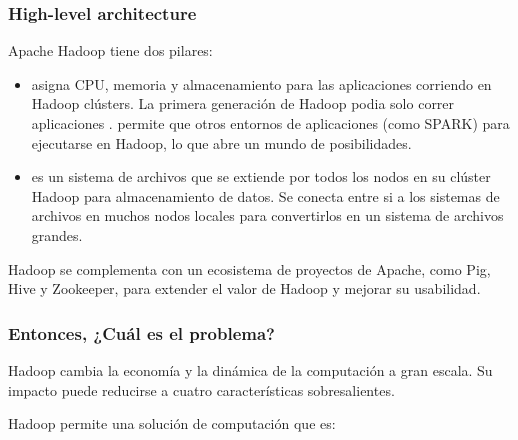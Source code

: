 \subsubsection*{High-level architecture} 
Apache Hadoop tiene dos pilares:

\begin{itemize}
	\item {} asigna CPU, memoria y almacenamiento para las aplicaciones corriendo en Hadoop clústers. La primera generación de Hadoop podia solo correr aplicaciones .  permite que otros entornos de aplicaciones (como SPARK) para ejecutarse en Hadoop, lo que abre un mundo de posibilidades.
	
	\item {} es un sistema de archivos que se extiende por todos los nodos en su clúster Hadoop para almacenamiento de datos. Se conecta entre si a los sistemas de archivos en muchos nodos locales para convertirlos en un sistema de archivos grandes.
\end{itemize}

Hadoop se complementa con un ecosistema de proyectos de Apache, como Pig\cite{online_ibm_meaning_pig}, Hive\cite{online_ibm_meaning_hive} y Zookeeper\cite{online_ibm_meaning_zookeeper}, para extender el valor de Hadoop y mejorar su usabilidad.


\subsubsection*{Entonces, ¿Cuál es el problema?}

Hadoop cambia la economía y la dinámica de la computación a gran escala. Su impacto puede reducirse a cuatro características sobresalientes.

Hadoop permite una solución de computación que es:


